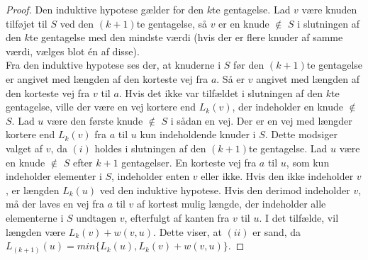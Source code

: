 \begin{proof}
Den induktive hypotese gælder for den $k$te gentagelse. 
Lad $v$ være knuden tilføjet til $S$ ved den $(k+1)$te gentagelse, så $v$ er en knude $\not\in$ $S$ i slutningen af den $k$te gentagelse med den mindste værdi (hvis der er flere knuder af samme værdi, vælges blot én af disse). \\
Fra den induktive hypotese ses der, at knuderne i $S$ før den $(k+1)$te gentagelse er angivet med længden af den korteste vej fra $a$. 
Så er $v$ angivet med længden af den korteste vej fra $v$ til $a$. 
Hvis det ikke var tilfældet i slutningen af den $k$te gentagelse, ville der være en vej kortere end $L_k(v)$, der indeholder en knude $\not\in$ $S$. 
Lad $u$ være den første knude $\not\in$ $S$ i sådan en vej. 
Der er en vej med længder kortere end $L_k(v)$ fra $a$ til $u$ kun indeholdende knuder i $S$. 
Dette modsiger valget af $v$, da $(i)$ holdes i slutningen af den $(k+1)$te gentagelse.
Lad $u$ være en knude $\not\in$ $S$ efter $k+1$ gentagelser. 
En korteste vej fra $a$ til $u$, som kun indeholder elementer i $S$, indeholder enten $v$ eller ikke. 
Hvis den ikke indeholder $v$, er længden $L_k(u)$ ved den induktive hypotese. 
Hvis den derimod indeholder $v$, må der laves en vej fra $a$ til $v$ af kortest mulig længde, der indeholder alle elementerne i $S$ undtagen $v$, efterfulgt af kanten fra $v$ til $u$. I det tilfælde, vil længden være $L_k(v)+w(v,u)$. Dette viser, at $(ii)$ er sand, da $L_(k+1)(u)=min \lbrace L_k(u), L_k(v)+w(v,u) \rbrace$. 
\end{proof}
